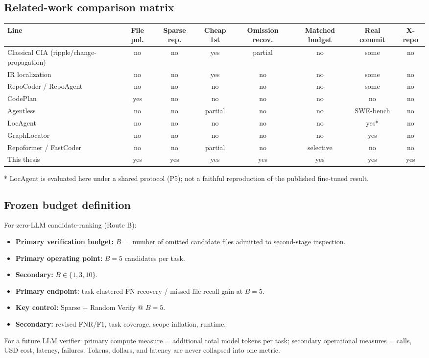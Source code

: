 \documentclass[11pt,a4paper]{article}
\begin{document}
\subsection{Related-work comparison matrix}
\centering
\footnotesize
\setlength{\tabcolsep}{3pt}
\begin{tabular}{@{}lccccccc@{}}
\toprule
Line & File pol. & Sparse rep. & Cheap 1st & Omission recov. & Matched budget & Real commit & X-repo \\
\midrule
Classical CIA (ripple/change-propagation) & no & no & yes & partial & no & some & no \\
IR localization & no & no & yes & no & no & some & no \\
RepoCoder / RepoAgent & no & no & no & no & no & some & no \\
CodePlan & yes & no & no & no & no & no & no \\
Agentless & no & no & partial & no & no & SWE-bench & no \\
LocAgent & no & no & no & no & no & yes* & no \\
GraphLocator & no & no & no & no & no & yes & no \\
Repoformer / FastCoder & no & no & partial & no & selective & no & no \\
This thesis & yes & yes & yes & yes & yes & yes & yes \\
\bottomrule
\end{tabular}

* LocAgent is evaluated here under a shared protocol (P5); not a faithful
reproduction of the published fine-tuned result.

\subsection{Frozen budget definition}
For zero-LLM candidate-ranking (Route B):
\begin{itemize}
  \item \textbf{Primary verification budget:} $B = $ number of omitted
        candidate files admitted to second-stage inspection.
  \item \textbf{Primary operating point:} $B = 5$ candidates per task.
  \item \textbf{Secondary:} $B \in \{1,3,10\}$.
  \item \textbf{Primary endpoint:} task-clustered FN recovery / missed-file
        recall gain at $B=5$.
  \item \textbf{Key control:} Sparse + Random Verify @ $B=5$.
  \item \textbf{Secondary:} revised FNR/F1, task coverage, scope inflation,
        runtime.
\end{itemize}
For a future LLM verifier: primary compute measure = additional total model
tokens per task; secondary operational measures = calls, USD cost, latency,
failures. Tokens, dollars, and latency are never collapsed into one metric.
\end{document}
